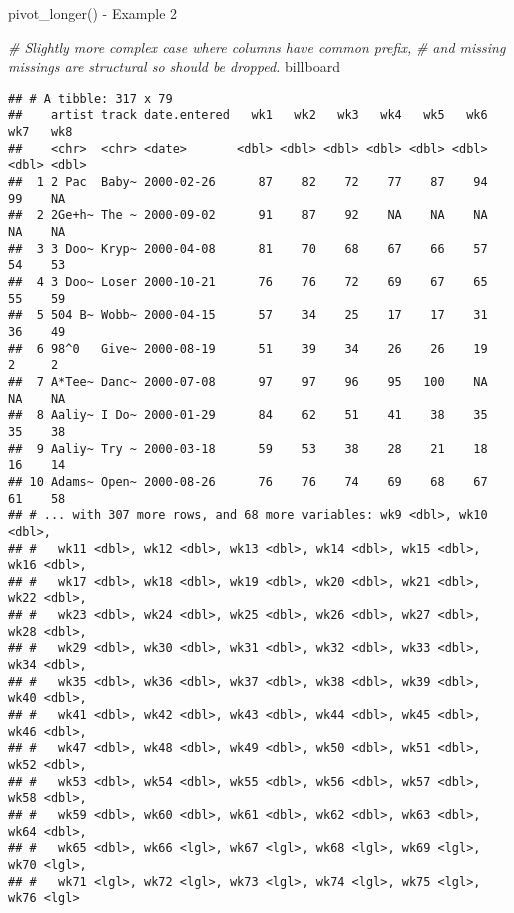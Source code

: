 \documentclass[
  ignorenonframetext,
]{beamer}
\newenvironment{Shaded}{\begin{snugshade}}{\end{snugshade}}
\newcommand{\CommentTok}[1]{\textcolor[rgb]{0.56,0.35,0.01}{\textit{#1}}}
\newcommand{\NormalTok}[1]{#1}
\begin{document}
\begin{frame}[fragile]{pivot\_longer() - Example 2}
\protect\hypertarget{pivot_longer---example-2-1}{}

\begin{Shaded}
\begin{Highlighting}[]
\CommentTok{# Slightly more complex case where columns have common prefix,}
\CommentTok{# and missing missings are structural so should be dropped.}
\NormalTok{billboard}
\end{Highlighting}
\end{Shaded}

\begin{verbatim}
## # A tibble: 317 x 79
##    artist track date.entered   wk1   wk2   wk3   wk4   wk5   wk6   wk7   wk8
##    <chr>  <chr> <date>       <dbl> <dbl> <dbl> <dbl> <dbl> <dbl> <dbl> <dbl>
##  1 2 Pac  Baby~ 2000-02-26      87    82    72    77    87    94    99    NA
##  2 2Ge+h~ The ~ 2000-09-02      91    87    92    NA    NA    NA    NA    NA
##  3 3 Doo~ Kryp~ 2000-04-08      81    70    68    67    66    57    54    53
##  4 3 Doo~ Loser 2000-10-21      76    76    72    69    67    65    55    59
##  5 504 B~ Wobb~ 2000-04-15      57    34    25    17    17    31    36    49
##  6 98^0   Give~ 2000-08-19      51    39    34    26    26    19     2     2
##  7 A*Tee~ Danc~ 2000-07-08      97    97    96    95   100    NA    NA    NA
##  8 Aaliy~ I Do~ 2000-01-29      84    62    51    41    38    35    35    38
##  9 Aaliy~ Try ~ 2000-03-18      59    53    38    28    21    18    16    14
## 10 Adams~ Open~ 2000-08-26      76    76    74    69    68    67    61    58
## # ... with 307 more rows, and 68 more variables: wk9 <dbl>, wk10 <dbl>,
## #   wk11 <dbl>, wk12 <dbl>, wk13 <dbl>, wk14 <dbl>, wk15 <dbl>, wk16 <dbl>,
## #   wk17 <dbl>, wk18 <dbl>, wk19 <dbl>, wk20 <dbl>, wk21 <dbl>, wk22 <dbl>,
## #   wk23 <dbl>, wk24 <dbl>, wk25 <dbl>, wk26 <dbl>, wk27 <dbl>, wk28 <dbl>,
## #   wk29 <dbl>, wk30 <dbl>, wk31 <dbl>, wk32 <dbl>, wk33 <dbl>, wk34 <dbl>,
## #   wk35 <dbl>, wk36 <dbl>, wk37 <dbl>, wk38 <dbl>, wk39 <dbl>, wk40 <dbl>,
## #   wk41 <dbl>, wk42 <dbl>, wk43 <dbl>, wk44 <dbl>, wk45 <dbl>, wk46 <dbl>,
## #   wk47 <dbl>, wk48 <dbl>, wk49 <dbl>, wk50 <dbl>, wk51 <dbl>, wk52 <dbl>,
## #   wk53 <dbl>, wk54 <dbl>, wk55 <dbl>, wk56 <dbl>, wk57 <dbl>, wk58 <dbl>,
## #   wk59 <dbl>, wk60 <dbl>, wk61 <dbl>, wk62 <dbl>, wk63 <dbl>, wk64 <dbl>,
## #   wk65 <dbl>, wk66 <lgl>, wk67 <lgl>, wk68 <lgl>, wk69 <lgl>, wk70 <lgl>,
## #   wk71 <lgl>, wk72 <lgl>, wk73 <lgl>, wk74 <lgl>, wk75 <lgl>, wk76 <lgl>
\end{verbatim}

\end{frame}
\end{document}
